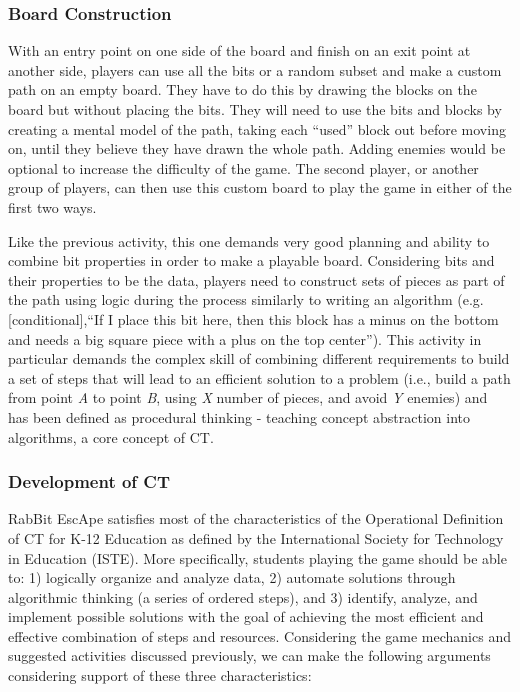 \documentclass{acm_proc_article-sp}
\begin{document}
\subsubsection{Board Construction}
With an entry point on one side of the board and finish on an exit point at another side, players can use all the bits or a random subset and make a custom path on an empty board.
They have to do this by drawing the blocks on the board but without placing the bits.
They will need to use the bits and blocks by creating a mental model of the path, taking each ``used'' block out before moving on, until they believe they have drawn the whole path.
Adding enemies would be optional to increase the difficulty of the game.
The second player, or another group of players, can then use this custom board to play the game in either of the first two ways.

Like the previous activity, this one demands very good planning and ability to combine bit properties in order to make a playable board. Considering bits and their properties to be the data, players need to construct sets of pieces as part of the path using logic during the process similarly to writing an algorithm (e.g. [conditional],``If I place this bit here, then this block has a minus on the bottom and needs a big square piece with a plus on the top center'').
This activity in particular demands the complex skill of combining different requirements to build a set of steps that will lead to an efficient solution to a problem (i.e., build a path from point \textit{A} to point \textit{B}, using \textit{X} number of pieces, and avoid \textit{Y} enemies) and has been defined as procedural thinking - teaching concept abstraction into algorithms\cite{papert1980mindstorms}, a core concept of CT\cite{national2010report}.

\subsubsection{Development of CT}

RabBit EscApe satisfies most of the characteristics of the Operational Definition of CT for K-12 Education as defined by the International Society for Technology in Education (ISTE)\cite{operationalct}. 
More specifically, students playing the game should be able to: 1) logically organize and analyze data, 2) automate solutions through algorithmic thinking (a series of ordered steps), and 3) identify, analyze, and implement possible solutions with the goal of achieving the most efficient and effective combination of steps and resources. 
Considering the game mechanics and suggested activities discussed previously, we can make the following arguments considering support of these three characteristics:
\end{document}
